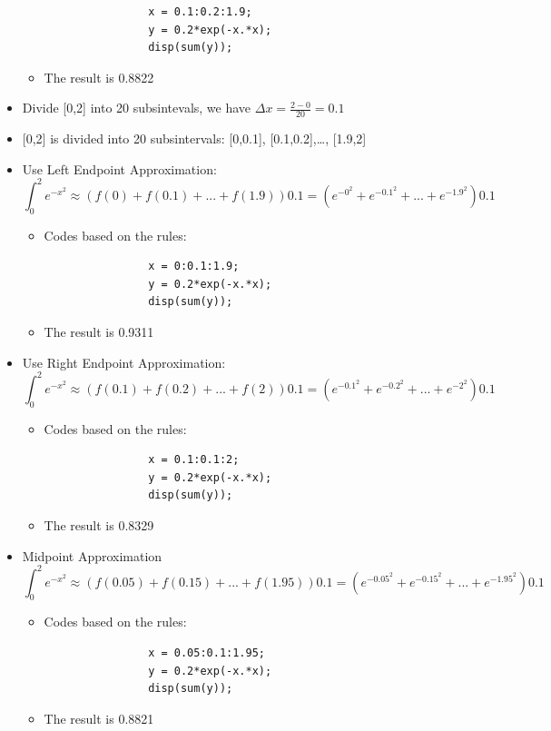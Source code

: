 \documentclass[12pt,en,a4paper]{article}
\begin{document}
\begin{itemize}
\begin{itemize}
\begin{mdframed}[hidealllines=true,backgroundcolor=magenta!10]
				\begin{lstlisting}
				x = 0.1:0.2:1.9;
				y = 0.2*exp(-x.*x);
				disp(sum(y));
				\end{lstlisting}
			\end{mdframed}
			\item The result is 0.8822
		\end{itemize}
		\item Divide [0,2] into 20 subsintevals, we have \(\Delta x=\frac{2-0}{20}=0.1\)
		\item {[0,2]} is divided into 20 subsintervals: [0,0.1], [0.1,0.2],…, [1.9,2]
		\item Use Left Endpoint Approximation:
		\[\int_{0}^{2}e^{-x^{2}}\approx (f(0)+f(0.1)+...+f(1.9))0.1=(e^{-0^{2}}+e^{-0.1^{2}}+...+e^{-1.9^{2}})0.1\]
		\begin{itemize}
			\item Codes based on the rules:\\
			\begin{mdframed}[hidealllines=true,backgroundcolor=magenta!10]
				\begin{lstlisting}
				x = 0:0.1:1.9;
				y = 0.2*exp(-x.*x);
				disp(sum(y));
				\end{lstlisting}
			\end{mdframed}
			\item The result is 0.9311
		\end{itemize}
		\item Use Right Endpoint Approximation:
		\[\int_{0}^{2}e^{-x^{2}}\approx (f(0.1)+f(0.2)+...+f(2))0.1=(e^{-0.1^{2}}+e^{-0.2^{2}}+...+e^{-2^{2}})0.1\]
		\begin{itemize}
			\item Codes based on the rules:\\
			\begin{mdframed}[hidealllines=true,backgroundcolor=magenta!10]
				\begin{lstlisting}
				x = 0.1:0.1:2;
				y = 0.2*exp(-x.*x);
				disp(sum(y));
				\end{lstlisting}
			\end{mdframed}
			\item The result is 0.8329
		\end{itemize}
		\item Midpoint Approximation
		\[\int_{0}^{2}e^{-x^{2}}\approx (f(0.05)+f(0.15)+...+f(1.95))0.1=(e^{-0.05^{2}}+e^{-0.15^{2}}+...+e^{-1.95^{2}})0.1\]
		\begin{itemize}
			\item Codes based on the rules:\\
			\begin{mdframed}[hidealllines=true,backgroundcolor=magenta!10]
				\begin{lstlisting}
				x = 0.05:0.1:1.95;
				y = 0.2*exp(-x.*x);
				disp(sum(y));
				\end{lstlisting}
			\end{mdframed}
			\item The result is 0.8821
		\end{itemize}
	\end{itemize}
	\newpage
\end{document}
